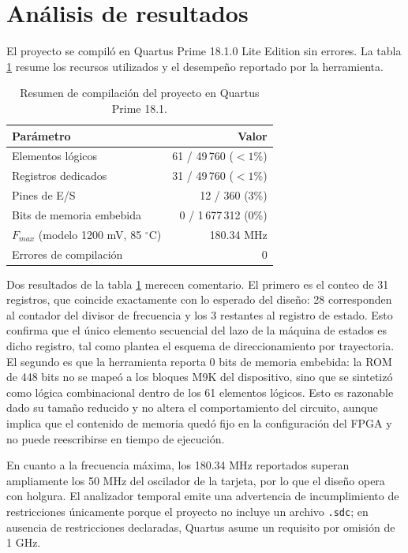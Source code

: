 \section{Análisis de resultados}

El proyecto se compiló en Quartus Prime 18.1.0 Lite Edition sin errores. La tabla
\ref{tab:sintesis} resume los recursos utilizados y el desempeño reportado por la
herramienta.

\begin{table}[H]
  \centering
  \caption{Resumen de compilación del proyecto en Quartus Prime 18.1.}
  \label{tab:sintesis}
  \begin{tabular}{@{}l r@{}}
    \toprule
    \textbf{Parámetro} & \textbf{Valor} \\
    \midrule
    Elementos lógicos            & 61 / 49\,760 ($<1\%$) \\
    Registros dedicados          & 31 / 49\,760 ($<1\%$) \\
    Pines de E/S                 & 12 / 360 (3\%) \\
    Bits de memoria embebida     & 0 / 1\,677\,312 (0\%) \\
    $F_{max}$ (modelo 1200 mV, 85 $^\circ$C) & 180.34 MHz \\
    Errores de compilación       & 0 \\
    \bottomrule
  \end{tabular}
\end{table}

Dos resultados de la tabla \ref{tab:sintesis} merecen comentario. El primero es el conteo
de 31 registros, que coincide exactamente con lo esperado del diseño: 28 corresponden al
contador del divisor de frecuencia y los 3 restantes al registro de estado. Esto confirma
que el único elemento secuencial del lazo de la máquina de estados es dicho registro, tal
como plantea el esquema de direccionamiento por trayectoria. El segundo es que la
herramienta reporta 0 bits de memoria embebida: la ROM de 448 bits no se mapeó a los
bloques M9K del dispositivo, sino que se sintetizó como lógica combinacional dentro de
los 61 elementos lógicos. Esto es razonable dado su tamaño reducido y no altera el
comportamiento del circuito, aunque implica que el contenido de memoria quedó fijo en la
configuración del FPGA y no puede reescribirse en tiempo de ejecución.

En cuanto a la frecuencia máxima, los 180.34 MHz reportados superan ampliamente los
50 MHz del oscilador de la tarjeta, por lo que el diseño opera con holgura. El analizador
temporal emite una advertencia de incumplimiento de restricciones únicamente porque el
proyecto no incluye un archivo \texttt{.sdc}; en ausencia de restricciones declaradas,
Quartus asume un requisito por omisión de 1 GHz.

